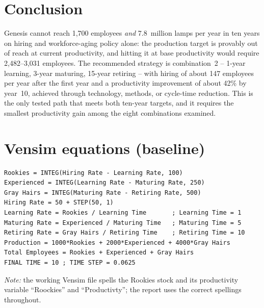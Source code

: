 \documentclass[11pt,a4paper]{article}
\begin{document}
\section{Conclusion}
Genesis cannot reach 1,700 employees \textit{and} 7.8~million lamps per year
in ten years on hiring and workforce-aging policy alone: the production
target is provably out of reach at current productivity, and hitting it at
base productivity would require 2,482--3,031 employees. The recommended
strategy is combination~2 -- 1-year learning, 3-year maturing, 15-year
retiring -- with hiring of about 147 employees per year after the first
year and a productivity improvement of about 42\% by year~10, achieved
through technology, methods, or cycle-time reduction. This is the only tested
path that meets both ten-year targets, and it requires the smallest
productivity gain among the eight combinations examined.

\appendix
\section{Vensim equations (baseline)}
\begin{verbatim}
Rookies = INTEG(Hiring Rate - Learning Rate, 100)
Experienced = INTEG(Learning Rate - Maturing Rate, 250)
Gray Hairs = INTEG(Maturing Rate - Retiring Rate, 500)
Hiring Rate = 50 + STEP(50, 1)
Learning Rate = Rookies / Learning Time       ; Learning Time = 1
Maturing Rate = Experienced / Maturing Time   ; Maturing Time = 5
Retiring Rate = Gray Hairs / Retiring Time    ; Retiring Time = 10
Production = 1000*Rookies + 2000*Experienced + 4000*Gray Hairs
Total Employees = Rookies + Experienced + Gray Hairs
FINAL TIME = 10 ; TIME STEP = 0.0625
\end{verbatim}
\textit{Note:} the working Vensim file spells the Rookies stock and its
productivity variable ``Roockies'' and ``Productivty''; the report uses the
correct spellings throughout.
\end{document}
